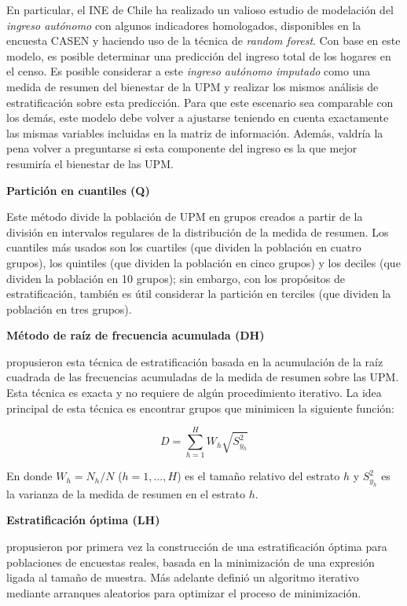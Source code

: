 \documentclass[12pt,spanish,]{book}
\begin{document}
En particular, el INE de Chile ha realizado un valioso estudio de modelación del \emph{ingreso autónomo} con algunos indicadores homologados, disponibles en la encuesta CASEN y haciendo uso de la técnica de \emph{random forest}. Con base en este modelo, es posible determinar una predicción del ingreso total de los hogares en el censo. Es posible considerar a este \emph{ingreso autónomo imputado} como una medida de resumen del bienestar de la UPM y realizar los mismos análisis de estratificación sobre esta predicción. Para que este escenario sea comparable con los demás, este modelo debe volver a ajustarse teniendo en cuenta exactamente las mismas variables incluidas en la matriz de información. Además, valdría la pena volver a preguntarse si esta componente del ingreso es la que mejor resumiría el bienestar de las UPM.

\textbf{Partición en cuantiles (Q)}

Este método divide la población de UPM en grupos creados a partir de la división en intervalos regulares de la distribución de la medida de resumen. Los cuantiles más usados son los cuartiles (que dividen la población en cuatro grupos), los quintiles (que dividen la población en cinco grupos) y los deciles (que dividen la población en 10 grupos); sin embargo, con los propósitos de estratificación, también es útil considerar la partición en terciles (que dividen la población en tres grupos).

\textbf{Método de raíz de frecuencia acumulada (DH)}

\textcite{Dalenius_Hodges_1959} propusieron esta técnica de estratificación basada en la acumulación de la raíz cuadrada de las frecuencias acumuladas de la medida de resumen sobre las UPM. Esta técnica es exacta y no requiere de algún procedimiento iterativo. La idea principal de esta técnica es encontrar grupos que minimicen la siguiente función:

\[
D = \sum_{h=1}^H W_h \sqrt{S^2_{y_{h}}}
\]

En donde \(W_h = N_h/N\) (\(h = 1, \ldots, H\)) es el tamaño relativo del estrato \(h\) y \(S^2_{y_{h}}\) es la varianza de la medida de resumen en el estrato \(h\).

\textbf{Estratificación óptima (LH)}

\textcite{Lavallee_Hidiroglou_1988} propusieron por primera vez la construcción de una estratificación óptima para poblaciones de encuestas reales, basada en la minimización de una expresión ligada al tamaño de muestra. Más adelante \textcite{Kozak_2004} definió un algoritmo iterativo mediante arranques aleatorios para optimizar el proceso de minimización.
\end{document}
